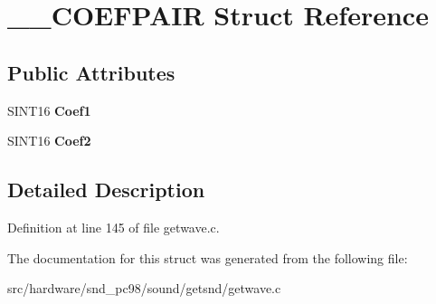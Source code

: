 \hypertarget{struct____COEFPAIR}{\section{\-\_\-\-\_\-\-C\-O\-E\-F\-P\-A\-I\-R Struct Reference}
\label{struct____COEFPAIR}
}
\subsection*{Public Attributes}
\begin{DoxyCompactItemize}
\item 
\hypertarget{struct____COEFPAIR_a8315a67f431721a182404c078b28ee70}{S\-I\-N\-T16 {\bfseries Coef1}}\label{struct____COEFPAIR_a8315a67f431721a182404c078b28ee70}

\item 
\hypertarget{struct____COEFPAIR_ab9ecdf962adee4661fc0382d04771148}{S\-I\-N\-T16 {\bfseries Coef2}}\label{struct____COEFPAIR_ab9ecdf962adee4661fc0382d04771148}

\end{DoxyCompactItemize}


\subsection{Detailed Description}


Definition at line 145 of file getwave.\-c.



The documentation for this struct was generated from the following file\-:\begin{DoxyCompactItemize}
\item 
src/hardware/snd\-\_\-pc98/sound/getsnd/getwave.\-c\end{DoxyCompactItemize}
